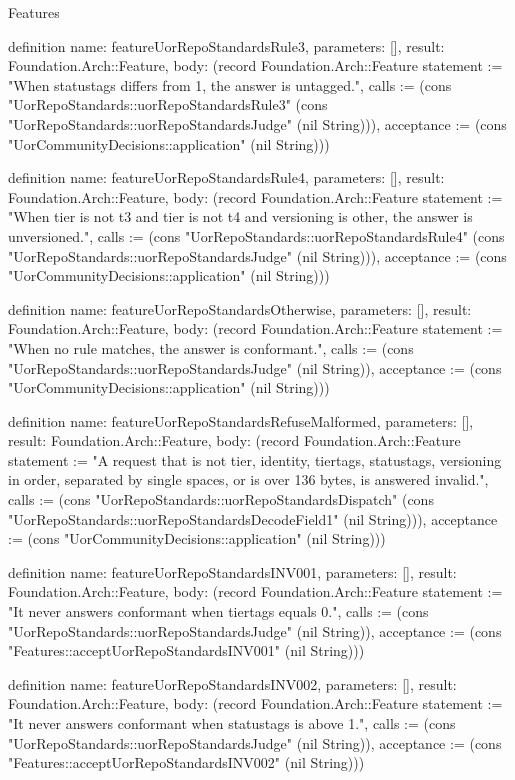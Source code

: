 \begin{lexlean}{Features}
\begin{semanticmodule}
definition{
  name: featureUorRepoStandardsRule3,
  parameters: [],
  result: Foundation.Arch::Feature,
  body: (record Foundation.Arch::Feature {statement := "When statustags differs from 1, the answer is untagged.", calls := (cons "UorRepoStandards::uorRepoStandardsRule3" (cons "UorRepoStandards::uorRepoStandardsJudge" (nil String))), acceptance := (cons "UorCommunityDecisions::application" (nil String))})
}

definition{
  name: featureUorRepoStandardsRule4,
  parameters: [],
  result: Foundation.Arch::Feature,
  body: (record Foundation.Arch::Feature {statement := "When tier is not t3 and tier is not t4 and versioning is other, the answer is unversioned.", calls := (cons "UorRepoStandards::uorRepoStandardsRule4" (cons "UorRepoStandards::uorRepoStandardsJudge" (nil String))), acceptance := (cons "UorCommunityDecisions::application" (nil String))})
}

definition{
  name: featureUorRepoStandardsOtherwise,
  parameters: [],
  result: Foundation.Arch::Feature,
  body: (record Foundation.Arch::Feature {statement := "When no rule matches, the answer is conformant.", calls := (cons "UorRepoStandards::uorRepoStandardsJudge" (nil String)), acceptance := (cons "UorCommunityDecisions::application" (nil String))})
}

definition{
  name: featureUorRepoStandardsRefuseMalformed,
  parameters: [],
  result: Foundation.Arch::Feature,
  body: (record Foundation.Arch::Feature {statement := "A request that is not tier, identity, tiertags, statustags, versioning in order, separated by single spaces, or is over 136 bytes, is answered invalid.", calls := (cons "UorRepoStandards::uorRepoStandardsDispatch" (cons "UorRepoStandards::uorRepoStandardsDecodeField1" (nil String))), acceptance := (cons "UorCommunityDecisions::application" (nil String))})
}

definition{
  name: featureUorRepoStandardsINV001,
  parameters: [],
  result: Foundation.Arch::Feature,
  body: (record Foundation.Arch::Feature {statement := "It never answers conformant when tiertags equals 0.", calls := (cons "UorRepoStandards::uorRepoStandardsJudge" (nil String)), acceptance := (cons "Features::acceptUorRepoStandardsINV001" (nil String))})
}

definition{
  name: featureUorRepoStandardsINV002,
  parameters: [],
  result: Foundation.Arch::Feature,
  body: (record Foundation.Arch::Feature {statement := "It never answers conformant when statustags is above 1.", calls := (cons "UorRepoStandards::uorRepoStandardsJudge" (nil String)), acceptance := (cons "Features::acceptUorRepoStandardsINV002" (nil String))})
}


\end{semanticmodule}
\end{lexlean}
